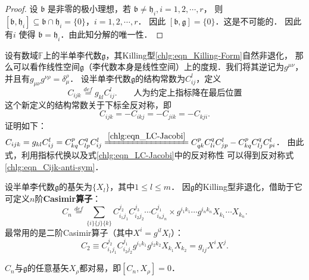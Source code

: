 \begin{proof}
    设 $\mathfrak{b}$ 是非零的极小理想，若 $\mathfrak{b} \neq \mathfrak{h}_i, i=1,2, \cdots, r$，
    则 $\left[\mathfrak{b}, \mathfrak{h}_i\right] \subseteq \mathfrak{b} \cap \mathfrak{h}_i=\{0\}$，$i=1,2, \cdots, r$．
    因此 $[\mathfrak{b}, \mathfrak{g}]=\{0\}$．这是不可能的．
    因此有$i$ 使得 $\mathfrak{b}=\mathfrak{h}_i$．由此知分解的唯一性．
\end{proof}



设有数域$\mathbb{F}$上的半单李代数$\mathfrak{g}$，其Killing型\eqref{chlg:eqn_Killing-Form}自然非退化，
那么可以看作线性空间$\mathfrak{g}$（李代数本身是线性空间）上的度规．我们将其逆记为$g^{\mu\nu}$，
并且有$g_{\mu\nu}g^{\nu\rho}=\delta^\rho_\mu$．
设半单李代数$\mathfrak{g}$的结构常数为$C_{ij}^l$，定义
\begin{equation}
    C_{ijk} \overset{def}{=} g_{kl} C_{ij}^l .
    \qquad \text{人为约定上指标降在最后位置}
\end{equation}
这个新定义的结构常数关于下标全反对称，即
\begin{equation}\label{chlg:eqn_Cijk-anti-sym}
    C_{ijk} = -C_{ikj} = -C_{jik} = -C_{kji} .
\end{equation}
证明如下：
$    C_{ijk} =  g_{kl} C_{ij}^l = C^p_{kq} C^q_{lp} C_{ij}^l
\xlongequal{\ref{chlg:eqn_LC-Jacobi}}
C^p_{qk} C^q_{li} C_{jp}^l -C^p_{kq} C^q_{lj} C_{pi}^l $．
由此式，利用指标代换以及式\eqref{chlg:eqn_LC-Jacobi}中的反对称性
可以得到反对称式\eqref{chlg:eqn_Cijk-anti-sym}．





设半单李代数$\mathfrak{g}$的基矢为$\{X_l\}$，其中$1\leqslant l \leqslant m$．
因$\mathfrak{g}$的Killing型非退化，借助于它可定义$n$阶{\bfseries \heiti Casimir算子}：
\begin{equation}\label{chlg:eqn_Casimir}
    C_n \overset{def}{=} \sum_{\{i\}\{j\}\{k\}}
    C_{i_1 j_1} ^{j_2} C_{i_2 j_2} ^{j_3}\cdots C_{i_n j_n} ^{j_1} 
    \times g^{i_1 k_1} \cdots g^{i_n k_n} X_{k_1} \cdots X_{k_n} .
\end{equation}
最常用的是二阶Casimir算子（其中$X^i=g^{il}X_l$）：
\begin{equation}\label{chlg:eqn_Casimir2}
    C_2 \equiv C_{i_1 j_1} ^{j_2} C_{i_2 j_2} ^{j_1}
    g^{i_1 k_1} g^{i_2 k_2} X_{k_1} X_{k_2} 
    = g_{ij} X^i X^j.
\end{equation}

\begin{theorem}\label{chlg:thm_CX=0}
    $C_n$与$\mathfrak{g}$的任意基矢$X_\rho$都对易，即$[C_n, X_\rho]=0$．
\end{theorem}     

